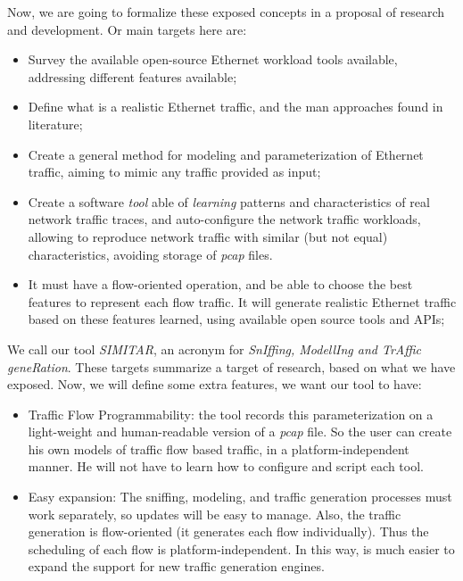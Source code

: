 Now, we are going to formalize these exposed concepts in a proposal of research and development. Or main targets here are:

\begin{itemize}

\item Survey the available open-source Ethernet workload tools available, addressing different features available;

\item Define what is a realistic Ethernet traffic, and the man approaches found in literature;

\item Create a general method for modeling and parameterization of Ethernet traffic, aiming to mimic any traffic provided as input;

\item Create a software \textit{tool} able of \textit{learning} patterns and characteristics of real network traffic traces, and auto-configure the network traffic workloads, allowing to reproduce network traffic with similar (but not equal) characteristics, avoiding storage of \textit{pcap} files. 

\item It must have a flow-oriented operation, and be able to choose the best features to represent each flow traffic. It will generate realistic Ethernet traffic based on these features learned, using available open source tools and APIs;


\end{itemize}

We call our  tool \textit{SIMITAR}, an acronym for \textit{SnIffing, ModellIng and TrAffic geneRation}.  These targets summarize a target of research, based on what we have exposed. Now, we will define some extra features, we want our tool to have:

\begin{itemize}

\item Traffic Flow Programmability: the tool records this parameterization on a light-weight and human-readable version of a \textit{pcap} file. So the user can create his own models of traffic flow based traffic, in a platform-independent manner. He will not have to learn how to configure and script each tool.

\item Easy expansion: The sniffing, modeling, and traffic generation processes must work separately, so updates will be easy to manage. Also, the traffic generation is flow-oriented (it generates each flow individually). Thus the scheduling of each flow is platform-independent. In this way, is much easier to expand the support for new traffic generation engines.

\end{itemize}

